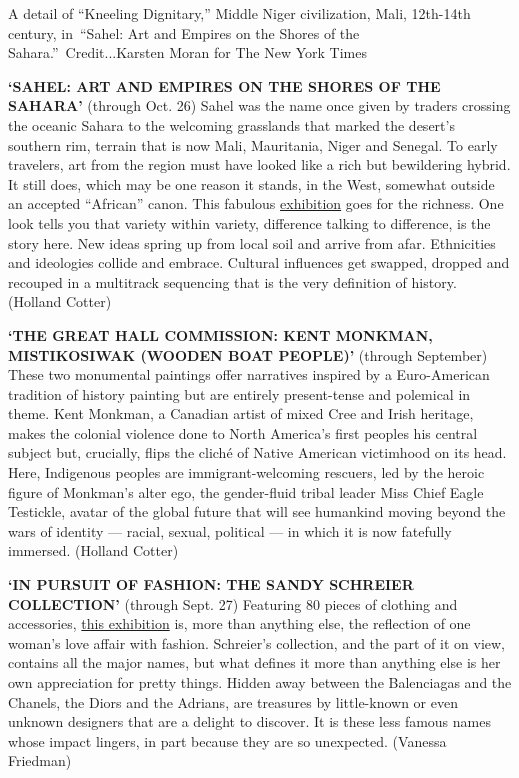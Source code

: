 A detail of ``Kneeling Dignitary,'' Middle Niger civilization, Mali,
12th-14th century, in~``Sahel: Art and Empires on the Shores of the
Sahara.''~Credit...Karsten Moran for The New York Times

\textbf{`SAHEL: ART AND EMPIRES ON THE SHORES OF THE SAHARA'} (through
Oct. 26) Sahel was the name once given by traders crossing the oceanic
Sahara to the welcoming grasslands that marked the desert's southern
rim, terrain that is now Mali, Mauritania, Niger and Senegal. To early
travelers, art from the region must have looked like a rich but
bewildering hybrid. It still does, which may be one reason it stands, in
the West, somewhat outside an accepted ``African'' canon. This fabulous
\href{https://www.metmuseum.org/exhibitions/listings/2020/sahel-art-empire-sahara}{exhibition}
goes for the richness. One look tells you that variety within variety,
difference talking to difference, is the story here. New ideas spring up
from local soil and arrive from afar. Ethnicities and ideologies collide
and embrace. Cultural influences get swapped, dropped and recouped in a
multitrack sequencing that is the very definition of history. (Holland
Cotter)

\textbf{`THE GREAT HALL COMMISSION: KENT MONKMAN, MISTIKOSIWAK (WOODEN
BOAT PEOPLE)'} (through September) These two monumental paintings offer
narratives inspired by a Euro-American tradition of history painting but
are entirely present-tense and polemical in theme. Kent Monkman, a
Canadian artist of mixed Cree and Irish heritage, makes the colonial
violence done to North America's first peoples his central subject but,
crucially, flips the cliché of Native American victimhood on its head.
Here, Indigenous peoples are immigrant-welcoming rescuers, led by the
heroic figure of Monkman's alter ego, the gender-fluid tribal leader
Miss Chief Eagle Testickle, avatar of the global future that will see
humankind moving beyond the wars of identity --- racial, sexual,
political --- in which it is now fatefully immersed. (Holland Cotter)

\textbf{`IN PURSUIT OF FASHION: THE SANDY SCHREIER COLLECTION'} (through
Sept. 27) Featuring 80 pieces of clothing and accessories,
\href{https://www.metmuseum.org/exhibitions/listings/2019/in-pursuit-of-fashion-the-sandy-schreier-collection}{this
exhibition} is, more than anything else, the reflection of one woman's
love affair with fashion. Schreier's collection, and the part of it on
view, contains all the major names, but what defines it more than
anything else is her own appreciation for pretty things. Hidden away
between the Balenciagas and the Chanels, the Diors and the Adrians, are
treasures by little-known or even unknown designers that are a delight
to discover. It is these less famous names whose impact lingers, in part
because they are so unexpected. (Vanessa Friedman)


